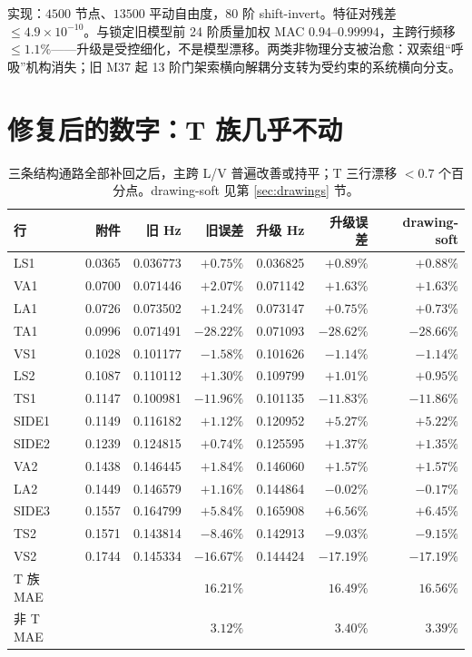 \documentclass[11pt,a4paper]{ctexart}
\begin{document}
实现：$4500$ 节点、$13500$ 平动自由度，80 阶 shift-invert。特征对残差 $\le4.9\times10^{-10}$。与锁定旧模型前 24 阶质量加权 MAC $0.94$--$0.99994$，主跨行频移 $\le1.1\%$——升级是受控细化，不是模型漂移。两类非物理分支被治愈：双索组``呼吸''机构消失；旧 M37 起 13 阶门架索横向解耦分支转为受约束的系统横向分支。

\section{修复后的数字：T 族几乎不动}

\begin{table}[h]\centering\footnotesize
\begin{tabular}{lrrrrrr}
\toprule
行 & 附件 & 旧 Hz & 旧误差 & 升级 Hz & 升级误差 & drawing-soft \\
\midrule
LS1 & 0.0365 & 0.036773 & $+0.75\%$ & 0.036825 & $+0.89\%$ & $+0.88\%$ \\
VA1 & 0.0700 & 0.071446 & $+2.07\%$ & 0.071142 & $+1.63\%$ & $+1.63\%$ \\
LA1 & 0.0726 & 0.073502 & $+1.24\%$ & 0.073147 & $+0.75\%$ & $+0.73\%$ \\
TA1 & 0.0996 & 0.071491 & $-28.22\%$ & 0.071093 & $\bm{-28.62\%}$ & $\bm{-28.66\%}$ \\
VS1 & 0.1028 & 0.101177 & $-1.58\%$ & 0.101626 & $-1.14\%$ & $-1.14\%$ \\
LS2 & 0.1087 & 0.110112 & $+1.30\%$ & 0.109799 & $+1.01\%$ & $+0.95\%$ \\
TS1 & 0.1147 & 0.100981 & $-11.96\%$ & 0.101135 & $\bm{-11.83\%}$ & $\bm{-11.86\%}$ \\
SIDE1 & 0.1149 & 0.116182 & $+1.12\%$ & 0.120952 & $+5.27\%$ & $+5.22\%$ \\
SIDE2 & 0.1239 & 0.124815 & $+0.74\%$ & 0.125595 & $+1.37\%$ & $+1.35\%$ \\
VA2 & 0.1438 & 0.146445 & $+1.84\%$ & 0.146060 & $+1.57\%$ & $+1.57\%$ \\
LA2 & 0.1449 & 0.146579 & $+1.16\%$ & 0.144864 & $-0.02\%$ & $-0.17\%$ \\
SIDE3 & 0.1557 & 0.164799 & $+5.84\%$ & 0.165908 & $+6.56\%$ & $+6.45\%$ \\
TS2 & 0.1571 & 0.143814 & $-8.46\%$ & 0.142913 & $\bm{-9.03\%}$ & $\bm{-9.15\%}$ \\
VS2 & 0.1744 & 0.145334 & $-16.67\%$ & 0.144424 & $-17.19\%$ & $-17.19\%$ \\
\midrule
T 族 MAE & & & $16.21\%$ & & $16.49\%$ & $16.56\%$ \\
非 T MAE & & & $3.12\%$ & & $3.40\%$ & $3.39\%$ \\
\bottomrule
\end{tabular}
\caption{三条结构通路全部补回之后，主跨 L/V 普遍改善或持平；T 三行漂移 $<0.7$ 个百分点。drawing-soft 见第 \ref{sec:drawings} 节。}
\end{table}
\end{document}
